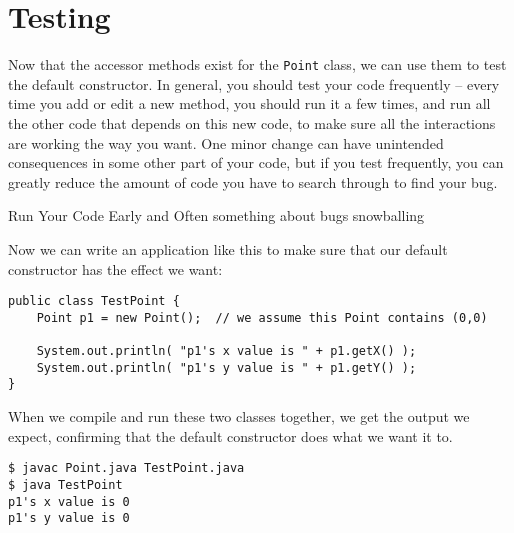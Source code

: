 \section{Testing}

Now that the accessor methods exist for the \texttt{Point} class, we can use them to test the default constructor.  In general, you should test your code frequently -- every time you add or edit a new method, you should run it a few times, and run all the other code that depends on this new code, to make sure all the interactions are working the way you want.  One minor change can have unintended consequences in some other part of your code, but if you test frequently, you can greatly reduce the amount of code you have to search through to find your bug.

\begin{tip}{Run Your Code Early and Often}
    something about bugs snowballing
\end{tip}

Now we can write an application like this to make sure that our default constructor has the effect we want:

\begin{verbatim}
public class TestPoint {
    Point p1 = new Point();  // we assume this Point contains (0,0)

    System.out.println( "p1's x value is " + p1.getX() );
    System.out.println( "p1's y value is " + p1.getY() );
}
\end{verbatim}

When we compile and run these two classes together, we get the output we expect, confirming that the default constructor does what we want it to.

\begin{verbatim}
$ javac Point.java TestPoint.java
$ java TestPoint
p1's x value is 0
p1's y value is 0
\end{verbatim}
